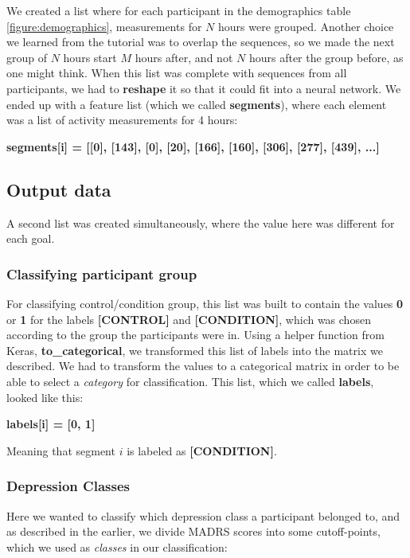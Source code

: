 We created a list where for each participant in the demographics table \ref{figure:demographics}, measurements for $N$ hours were grouped. 
Another choice we learned from the tutorial was to overlap the sequences, so we made the next group of $N$ hours start \textit{$M$} hours after, 
and not \textit{$N$} hours after the group before, as one might think. When this list was complete with sequences from all participants, we 
had to \textbf{reshape} it so that it could fit into a neural network. We ended up with a feature list (which we called \textbf{segments}), 
where each element was a list of activity measurements for 4 hours: 

\textbf{segments[i] = [[0], [143], [0], [20], [166], [160], [306], [277], [439], ...]}

\subsection{Output data}

A second list was created simultaneously, where the value here was different for each goal. 

\subsubsection{Classifying participant group}

For classifying control/condition group, this list was built to contain the values \textbf{0} or \textbf{1} for the labels \textbf{[CONTROL]} and \textbf{[CONDITION]}, which was chosen according to the group the participants were in. Using a helper function from Keras, \textbf{to\_categorical}, we transformed this list of labels into the matrix we described. We had to transform the values to a categorical matrix in order to be able to select a \textit{category} for classification. This list, which we called \textbf{labels}, looked like this: 

\textbf{labels[i] = [0, 1]}

\noindent Meaning that segment $i$ is labeled as \textbf{[CONDITION]}.

\subsubsection{Depression Classes}
Here we wanted to classify which depression class a participant belonged to, and as described in the earlier, we divide MADRS scores into some cutoff-points, which we used as \textit{classes} in our classification:

